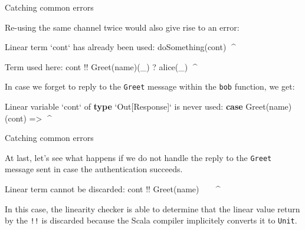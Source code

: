 \documentclass[ignorenonframetext,]{beamer}
\newenvironment{Shaded}{}{}
\newcommand{\FunctionTok}[1]{\textcolor[rgb]{0.02,0.16,0.49}{#1}}
\newcommand{\KeywordTok}[1]{\textcolor[rgb]{0.00,0.44,0.13}{\textbf{#1}}}
\newcommand{\NormalTok}[1]{#1}
\begin{document}
\begin{frame}[fragile]{%
\protect\hypertarget{catching-common-errors-1}{%
Catching common errors}}

Re-using the same channel twice would also give rise to an error:

\begin{Shaded}
\begin{Highlighting}[]
\NormalTok{Linear term `cont` has already been used:}
    \FunctionTok{doSomething}\NormalTok{(cont)}
\NormalTok{                ^^^^}

\NormalTok{Term used here:}
\NormalTok{    cont !! }\FunctionTok{Greet}\NormalTok{(name)(_) ? }\FunctionTok{alice}\NormalTok{(_)}
\NormalTok{    ^^^^}
\end{Highlighting}
\end{Shaded}

In case we forget to reply to the \texttt{Greet} message within the
\texttt{bob} function, we get:

\begin{Shaded}
\begin{Highlighting}[]
\NormalTok{Linear variable `cont` of }\KeywordTok{type}\NormalTok{ `Out[Response]` is never used:}
    \KeywordTok{case} \FunctionTok{Greet}\NormalTok{(name)(cont) =>}
\NormalTok{                     ^^^^}
\end{Highlighting}
\end{Shaded}

\end{frame}

\begin{frame}[fragile]{%
\protect\hypertarget{catching-common-errors-2}{%
Catching common errors}}

At last, let’s see what happens if we do not handle the reply to the
\texttt{Greet} message sent in case the authentication succeeds.

\begin{Shaded}
\begin{Highlighting}[]
\NormalTok{Linear term cannot be discarded:}
\NormalTok{    cont !! }\FunctionTok{Greet}\NormalTok{(name)}
\NormalTok{    ^^^^^^^^^^^^^^^^^^^}
\end{Highlighting}
\end{Shaded}

In this case, the linearity checker is able to determine that the linear
value return by the \texttt{!!} is discarded because the Scala compiler
implicitely converts it to \texttt{Unit}.

\end{frame}
\end{document}
